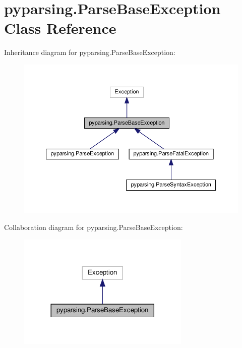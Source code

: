 \hypertarget{classpyparsing_1_1ParseBaseException}{}\section{pyparsing.\+Parse\+Base\+Exception Class Reference}
\label{classpyparsing_1_1ParseBaseException}


Inheritance diagram for pyparsing.\+Parse\+Base\+Exception\+:
\nopagebreak
\begin{figure}[H]
\begin{center}
\leavevmode
\includegraphics[width=350pt]{classpyparsing_1_1ParseBaseException__inherit__graph}
\end{center}
\end{figure}


Collaboration diagram for pyparsing.\+Parse\+Base\+Exception\+:
\nopagebreak
\begin{figure}[H]
\begin{center}
\leavevmode
\includegraphics[width=233pt]{classpyparsing_1_1ParseBaseException__coll__graph}
\end{center}
\end{figure}
